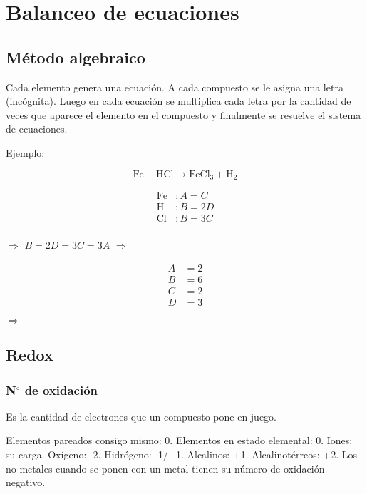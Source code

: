 \section{Balanceo de ecuaciones}

\subsection{Método algebraico}

Cada elemento genera una ecuación. A cada compuesto se le asigna una letra (incógnita). Luego en cada ecuación se multiplica cada letra por la cantidad de veces que aparece el elemento en el compuesto y finalmente se resuelve el sistema de ecuaciones.

\skipline
\underline{Ejemplo:}

$$\text{Fe} + \text{HCl} \longrightarrow \text{FeCl}_3 + \text{H}_2$$

\begin{minipage}[l]{0.2\textwidth}
\begin{align*}
\text{Fe}&: A = C\\
\text{H}&: B = 2D\\
\text{Cl}&: B = 3C\\
\;
\end{align*}
\end{minipage}
$\Longrightarrow$
\hfil
$B=2D=3C=3A$
\hfil
$\Longrightarrow$
\begin{minipage}[l]{0.1\textwidth}
\begin{align*}
A&= 2\\
B&= 6\\
C&= 2\\
D&= 3
\end{align*}
\end{minipage}
$\Longrightarrow$
\hfil 
{}
\hfil

\subsection{Redox}

\subsubsection*{N$^\circ$ de oxidación}

Es la cantidad de electrones que un compuesto pone en juego.

Elementos pareados consigo mismo: 0. Elementos en estado elemental: 0. Iones: su carga. Oxígeno: -2. Hidrógeno: -1/+1. Alcalinos: +1. Alcalinotérreos: +2. Los no metales cuando se ponen con un metal tienen su número de oxidación negativo.

